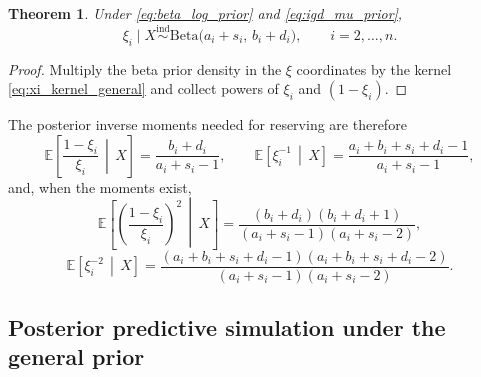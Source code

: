 \documentclass[11pt]{article}
\newtheorem{theorem}{Theorem}
\newcommand{\E}{\mathbb{E}}
\newcommand{\1}{\mathbf{1}}
\newcommand{\BetaD}{\mathrm{Beta}}
\begin{document}
\begin{theorem}\label{thm:xi_posterior_general}
Under \eqref{eq:beta_log_prior} and \eqref{eq:igd_mu_prior},
\begin{equation}
\xi_i\mid X \stackrel{\mathrm{ind}}{\sim}
\BetaD\!\bigl(a_i+s_i,\,b_i+d_i\bigr),
\qquad i=2,\dots,n.
\label{eq:xi_posterior_general}
\end{equation}
\end{theorem}

\begin{proof}
Multiply the beta prior density in the $\xi$ coordinates by the kernel \eqref{eq:xi_kernel_general} and collect powers of $\xi_i$ and $(1-\xi_i)$.
\end{proof}

The posterior inverse moments needed for reserving are therefore
\begin{equation}
\E\!\left[\frac{1-\xi_i}{\xi_i}\,\middle|\,X\right]
=
\frac{b_i+d_i}{a_i+s_i-1},
\qquad
\E\!\left[\xi_i^{-1}\,\middle|\,X\right]
=
\frac{a_i+b_i+s_i+d_i-1}{a_i+s_i-1},
\label{eq:inverse_moments_xi_general}
\end{equation}
and, when the moments exist,
\begin{equation}
\E\!\left[\left(\frac{1-\xi_i}{\xi_i}\right)^2\,\middle|\,X\right]
=
\frac{(b_i+d_i)(b_i+d_i+1)}{(a_i+s_i-1)(a_i+s_i-2)},
\end{equation}
\begin{equation}
\E\!\left[\xi_i^{-2}\,\middle|\,X\right]
=
\frac{(a_i+b_i+s_i+d_i-1)(a_i+b_i+s_i+d_i-2)}{(a_i+s_i-1)(a_i+s_i-2)}.
\label{eq:inverse_second_moments_xi_general}
\end{equation}

\subsection{Posterior predictive simulation under the general prior}\label{sec:predictive_simulation_general}
\end{document}
